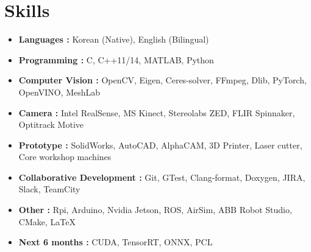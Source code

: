 \documentclass[letterpaper,11pt]{article}
\newcommand{\resumeItem}[1]{
  \item\small{
    {#1 \vspace{-2pt}}
  }
}
\newcommand{\resumeSubItem}[2]{\resumeItem{#1}{#2}\vspace{-4pt}}
\newcommand{\resumeSubHeadingListStart}{\begin{itemize}[leftmargin=*]}
\newcommand{\resumeSubHeadingListEnd}{\end{itemize}}
\begin{document}
\section{Skills}
  \resumeSubHeadingListStart
    \resumeSubItem{\textbf{Languages :}}
      {Korean (Native), English (Bilingual)}
    \resumeSubItem{\textbf{Programming :}}
      {C, C++11/14, MATLAB, Python}
    \resumeSubItem{\textbf{Computer Vision :}}
      {OpenCV, Eigen, Ceres-solver, FFmpeg, Dlib, PyTorch, OpenVINO,  MeshLab }
    \resumeSubItem{\textbf{Camera :}}
      {Intel RealSense, MS Kinect, Stereolabs ZED, FLIR Spinnaker, Optitrack Motive}
    \resumeSubItem{\textbf{Prototype :}}
      {SolidWorks, AutoCAD, AlphaCAM, 3D Printer, Laser cutter, Core workshop machines}
    \resumeSubItem{\textbf{Collaborative Development :}}
      {Git, GTest, Clang-format, Doxygen, JIRA, Slack, TeamCity}
    \resumeSubItem{\textbf{Other :}}
      {Rpi, Arduino, Nvidia Jetson, ROS, AirSim, ABB Robot Studio, CMake, LaTeX}
    \resumeSubItem{\textbf{Next 6 months :}}
      {CUDA, TensorRT, ONNX, PCL}
  \resumeSubHeadingListEnd

\end{document}
